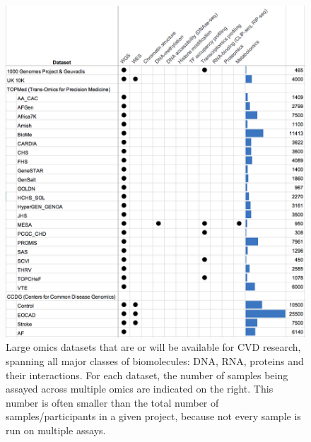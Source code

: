 \documentclass[letter]{bioinfo}
\begin{document}
	\begin{figure}[!tpb]
	\includegraphics[width=1\linewidth]{trans-omics-data-sets.png}
		\caption{Large omics datasets that are or will be available for CVD research, spanning all major classes of biomolecules: DNA, RNA, proteins and their interactions. For each dataset, the number of samples being assayed across multiple omics are indicated on the right. This number is often smaller than the total number of samples/participants in a given project, because not every sample is run on multiple assays.}
		\label{fig:trans-omics}
	\end{figure} 
	
\end{document}
